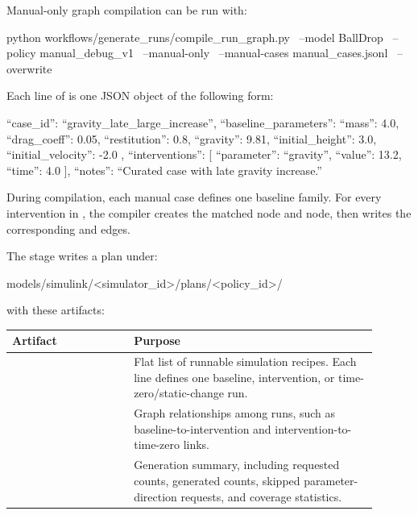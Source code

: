 \documentclass[11pt]{article}
\begin{document}
Manual-only graph compilation can be run with:

\begin{DocCode}
python workflows/generate_runs/compile_run_graph.py \
  --model BallDrop \
  --policy manual_debug_v1 \
  --manual-only \
  --manual-cases manual_cases.jsonl \
  --overwrite
\end{DocCode}

Each line of  is one JSON object of the following form:

\begin{DocCode}
{
“case_id”: “gravity_late_large_increase”,
“baseline_parameters”: {
“mass”: 4.0,
“drag_coeff”: 0.05,
“restitution”: 0.8,
“gravity”: 9.81,
“initial_height”: 3.0,
“initial_velocity”: -2.0
},
“interventions”: [
{
“parameter”: “gravity”,
“value”: 13.2,
“time”: 4.0
}
],
“notes”: “Curated case with late gravity increase.”
}
\end{DocCode}

During compilation, each manual case defines one baseline family.
For every intervention in \code{interventions}, the compiler creates the matched  node and  node, then writes the corresponding  and  edges.

The stage writes a plan under:

\begin{DocCode}
models/simulink/<simulator_id>/plans/<policy_id>/
\end{DocCode}

with these artifacts:

\begin{center}
\begin{tabular}{p{0.30\linewidth}p{0.60\linewidth}}
\hline
\textbf{Artifact} & \textbf{Purpose} \\
\hline
\code{run_nodes.jsonl} & Flat list of runnable simulation recipes. Each line defines one baseline, intervention, or time-zero/static-change run. \\
\code{run_edges.jsonl} & Graph relationships among runs, such as baseline-to-intervention and intervention-to-time-zero links. \\
\code{generation_report.json} & Generation summary, including requested counts, generated counts, skipped parameter-direction requests, and coverage statistics. \\
\hline
\end{tabular}
\end{center}
\end{document}
